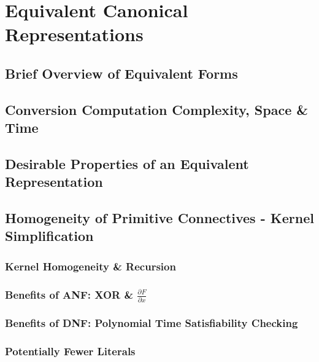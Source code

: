 \section{Equivalent Canonical Representations}
\subsection{Brief Overview of Equivalent Forms}
\subsection{Conversion Computation Complexity, Space \& Time}
\subsection{Desirable Properties of an Equivalent Representation}
\subsection{Homogeneity of Primitive Connectives - Kernel Simplification}
\subsubsection{Kernel Homogeneity \& Recursion} 
\subsubsection{Benefits of ANF: XOR \& $\frac{\partial{F}}{\partial{x}}$}
\subsubsection{Benefits of DNF: Polynomial Time Satisfiability Checking}
\subsubsection{Potentially Fewer Literals}
